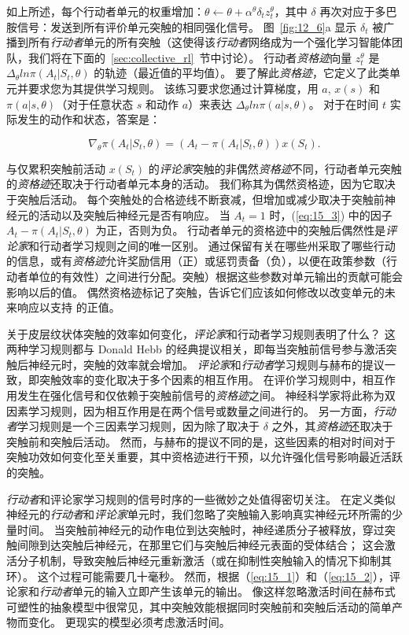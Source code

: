 如上所述，每个行动者单元的权重增加：$\theta \longleftarrow \theta + \alpha^{\theta} \delta_t z_t^{\theta}$，其中 $\delta$ 再次对应于多巴胺信号：发送到所有评价单元突触的相同强化信号。
图~\ref{fig:12_6}a 显示 $\delta_t$ 被广播到所有\textit{行动者}单元的所有突触（这使得该\textit{行动者}网络成为一个强化学习智能体团队，我们将在下面的~\ref{sec:collective_rl}~节中讨论）。
行动者\textit{资格迹}向量 $z_t^{\theta}$ 是 $\Delta_\theta ln \pi (A_t|S_t, \theta)$ 的轨迹（最近值的平均值）。
要了解此\textit{资格迹}，它定义了此类单元并要求您为其提供学习规则。
该练习要求您通过计算梯度，用 $a$, $x(s)$ 和 $\pi(a|s, \theta)$（对于任意状态 $s$ 和动作 $a$）来表达 $\Delta _\theta ln \pi (a|s, \theta)$。
对于在时间 $t$ 实际发生的动作和状态，答案是：

\begin{equation} \label{eq:15_3}
	\nabla_{\theta} \pi (A_t | S_t, \theta)
		= (A_t - \pi(A_t|S_t, \theta)) x(S_t).
\end{equation}


与仅累积突触前活动 $x(S_t)$ 的\textit{评论家}突触的非偶然\textit{资格迹}不同，行动者单元突触的\textit{资格迹}还取决于行动者单元本身的活动。
我们称其为偶然资格迹，因为它取决于突触后活动。
每个突触处的合格迹线不断衰减，但增加或减少取决于突触前神经元的活动以及突触后神经元是否有响应。
当 $A_t = 1$ 时，(\ref{eq:15_3}) 中的因子 $A_t - \pi(A_t|S_t, \theta)$ 为正，否则为负。
行动者单元的资格迹中的突触后偶然性是\textit{评论家}和行动者学习规则之间的唯一区别。
通过保留有关在哪些州采取了哪些行动的信息，或有\textit{资格迹}允许奖励信用（正）或惩罚责备（负），以便在政策参数（行动者单位的有效性）之间进行分配。突触）根据这些参数对单元输出的贡献可能会影响以后的值。
偶然资格迹标记了突触，告诉它们应该如何修改以改变单元的未来响应以支持 的正值。


关于皮层纹状体突触的效率如何变化，\textit{评论家}和行动者学习规则表明了什么？
这两种学习规则都与 Donald Hebb 的经典提议相关，即每当突触前信号参与激活突触后神经元时，突触的效率就会增加\cite{hebb2005organization}。
\textit{评论家}和\textit{行动者}学习规则与赫布的提议一致，即突触效率的变化取决于多个因素的相互作用。
在评价学习规则中，相互作用发生在强化信号和仅依赖于突触前信号的\textit{资格迹}之间。
神经科学家将此称为双因素学习规则，因为相互作用是在两个信号或数量之间进行的。
另一方面，\textit{行动者}学习规则是一个三因素学习规则，因为除了取决于 $\delta$ 之外，其\textit{资格迹}还取决于突触前和突触后活动。
然而，与赫布的提议不同的是，这些因素的相对时间对于突触功效如何变化至关重要，其中资格迹进行干预，以允许强化信号影响最近活跃的突触。


\textit{行动者}和评论家学习规则的信号时序的一些微妙之处值得密切关注。
在定义类似神经元的\textit{行动者}和\textit{评论家}单元时，我们忽略了突触输入影响真实神经元环所需的少量时间。
当突触前神经元的动作电位到达突触时，神经递质分子被释放，穿过突触间隙到达突触后神经元，在那里它们与突触后神经元表面的受体结合；
这会激活分子机制，导致突触后神经元重新激活（或在抑制性突触输入的情况下抑制其环）。
这个过程可能需要几十毫秒。
然而，根据（\ref{eq:15_1}）和（\ref{eq:15_2}），评论家和\textit{行动者}单元的输入立即产生该单元的输出。
像这样忽略激活时间在赫布式可塑性的抽象模型中很常见，其中突触效能根据同时突触前和突触后活动的简单产物而变化。
更现实的模型必须考虑激活时间。


